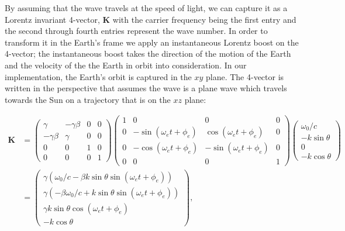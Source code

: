 \documentclass[onecolumn, groupedaddress, 10pt]{revtex4-1}
\begin{document}
By assuming that the wave travels at the speed of light, we can capture it as a Lorentz invariant 4-vector, $\mathbf{K}$ with the carrier frequency being the first entry and the second through fourth entries represent the wave number. In order to transform it in the Earth's frame we apply an instantaneous Lorentz boost on the 4-vector; the instantaneous boost takes the direction of the motion of the Earth and the velocity of the the Earth in orbit into consideration. In our implementation, the Earth's orbit is captured in the $xy$ plane. The 4-vector is written in the perspective that assumes the wave is a plane wave which travels towards the Sun on a trajectory that is on the $xz$ plane: %

\begin{align}
\label{eqn: new k}
\mathbf{K} &=
\left( \begin{array}{cccc}
	    \gamma   & -\gamma \beta & 0 & 0 \\
	-\gamma \beta &    \gamma    & 0 & 0 \\
	      0      &       0      & 1 & 0 \\
	      0      &       0      & 0 & 1
\end{array} \right)
\left( \begin{array}{cccc}
	1 &               0             &              0               & 0 \\
	0 & -\sin (\omega_e t + \phi_e) &  \cos (\omega_e t + \phi_e)  & 0 \\
	0 & -\cos (\omega_e t + \phi_e) &  -\sin (\omega_e t + \phi_e) & 0 \\
	0 &               0             &              0               & 1
\end{array} \right)							 
\left( \begin{array}{c}	
	   \omega_0 / c   \\
	- k \sin \theta \\
	        0       \\
	- k \cos \theta    
\end{array} \right)																			\\
&=
\left( \begin{array}{c}
	\gamma \left(\omega_0 / c - \beta k \sin \theta \sin (\omega_e t + \phi_e)\right) \\
	\gamma \left(-\beta \omega_0 / c + k \sin \theta \sin (\omega_e t + \phi_e)\right) \\
	           \gamma k \sin \theta \cos (\omega_e t + \phi_e)           \\
	                           - k \cos \theta
\end{array} \right)   ,
\end{align}
\end{document}

